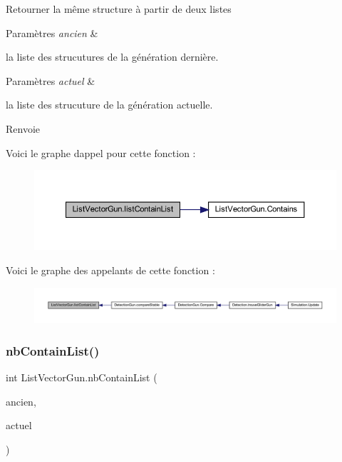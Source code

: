 Retourner la même structure à partir de deux listes 


\begin{DoxyParams}{Paramètres}
{\em ancien} & \\
\hline
\end{DoxyParams}
la liste des strucutures de la génération dernière. 
\begin{DoxyParams}{Paramètres}
{\em actuel} & \\
\hline
\end{DoxyParams}
la liste des strucuture de la génération actuelle. \begin{DoxyReturn}{Renvoie}

\end{DoxyReturn}
Voici le graphe d\textquotesingle{}appel pour cette fonction \+:
\nopagebreak
\begin{figure}[H]
\begin{center}
\leavevmode
\includegraphics[width=350pt]{class_list_vector_gun_a73d0b1fca681bce5aaf680873b071827_cgraph}
\end{center}
\end{figure}
Voici le graphe des appelants de cette fonction \+:
\nopagebreak
\begin{figure}[H]
\begin{center}
\leavevmode
\includegraphics[width=350pt]{class_list_vector_gun_a73d0b1fca681bce5aaf680873b071827_icgraph}
\end{center}
\end{figure}
\mbox{\label{class_list_vector_gun_a23dabaffda742276390b578c091d101a}} 
\subsubsection{\texorpdfstring{nb\+Contain\+List()}{nbContainList()}}
{\footnotesize\ttfamily int List\+Vector\+Gun.\+nb\+Contain\+List (\begin{DoxyParamCaption}\item[{\mbox{\hyperlink{class_list_vector_gun}{List\+Vector\+Gun}}}]{ancien,  }\item[{\mbox{\hyperlink{class_list_vector_gun}{List\+Vector\+Gun}}}]{actuel }\end{DoxyParamCaption})\hspace{0.3cm}{\ttfamily [inline]}}



